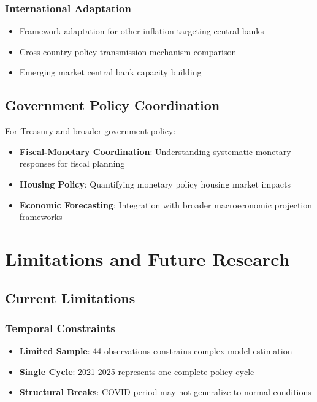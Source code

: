 \documentclass[11pt,a4paper]{article}
\begin{document}
	\subsubsection{International Adaptation}
	\begin{itemize}
		\item Framework adaptation for other inflation-targeting central banks
		\item Cross-country policy transmission mechanism comparison
		\item Emerging market central bank capacity building
	\end{itemize}
	
	\subsection{Government Policy Coordination}
	For Treasury and broader government policy:
	
	\begin{itemize}
		\item \textbf{Fiscal-Monetary Coordination}: Understanding systematic monetary responses for fiscal planning
		\item \textbf{Housing Policy}: Quantifying monetary policy housing market impacts
		\item \textbf{Economic Forecasting}: Integration with broader macroeconomic projection frameworks
	\end{itemize}
	
	\section{Limitations and Future Research}
	
	\subsection{Current Limitations}
	
	\subsubsection{Temporal Constraints}
	\begin{itemize}
		\item \textbf{Limited Sample}: 44 observations constrains complex model estimation
		\item \textbf{Single Cycle}: 2021-2025 represents one complete policy cycle
		\item \textbf{Structural Breaks}: COVID period may not generalize to normal conditions
	\end{itemize}
	
\end{document}
